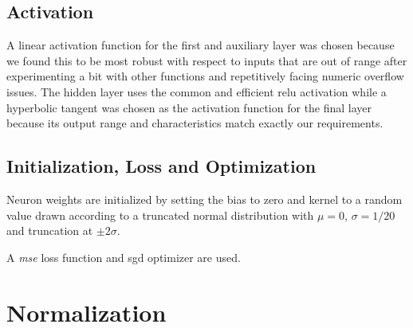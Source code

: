 \documentclass{graphstudy}
\begin{document}
\subsection{Activation}

A linear activation function for the first and auxiliary layer was chosen because we found this to be most robust with
respect to inputs that are out of range after experimenting a bit with other functions and repetitively facing numeric
overflow issues.  The hidden layer uses the common and efficient \ac{relu} activation while a hyperbolic tangent was
chosen as the activation function for the final layer because its output range and characteristics match exactly our
requirements.

\subsection{Initialization, Loss and Optimization}

Neuron weights are initialized by setting the bias to zero and kernel to a random value drawn according to a truncated
normal distribution with \(\mu=0\), \(\sigma=1/20\) and truncation at \(\pm2\sigma\).

A \emph{\acf{mse}} loss function and \acf{sgd} optimizer are used.

\section{Normalization}
\end{document}
